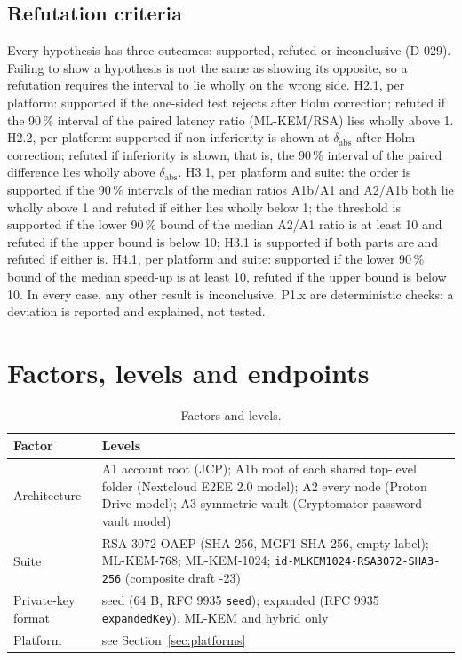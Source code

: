 \documentclass[11pt,a4paper]{article}
\begin{document}
\subsection{Refutation criteria}\label{sec:refutation}
Every hypothesis has three outcomes: supported, refuted or inconclusive (D-029). Failing to show a hypothesis is not the same as showing its opposite, so a refutation requires the interval to lie wholly on the wrong side. H2.1, per platform: supported if the one-sided test rejects after Holm correction; refuted if the 90\,\% interval of the paired latency ratio (ML-KEM/RSA) lies wholly above 1. H2.2, per platform: supported if non-inferiority is shown at $\delta_{\mathrm{abs}}$ after Holm correction; refuted if inferiority is shown, that is, the 90\,\% interval of the paired difference lies wholly above $\delta_{\mathrm{abs}}$. H3.1, per platform and suite: the order is supported if the 90\,\% intervals of the median ratios A1b/A1 and A2/A1b both lie wholly above 1 and refuted if either lies wholly below 1; the threshold is supported if the lower 90\,\% bound of the median A2/A1 ratio is at least 10 and refuted if the upper bound is below 10; H3.1 is supported if both parts are and refuted if either is. H4.1, per platform and suite: supported if the lower 90\,\% bound of the median speed-up is at least 10, refuted if the upper bound is below 10. In every case, any other result is inconclusive. P1.x are deterministic checks: a deviation is reported and explained, not tested.

\section{Factors, levels and endpoints}
\begin{table}[H]
\centering\small
\caption{Factors and levels.}
\begin{tabularx}{\textwidth}{l L}
\toprule
\textbf{Factor} & \textbf{Levels}\\
\midrule
Architecture & A1 account root (JCP); A1b root of each shared top-level folder (Nextcloud E2EE 2.0 model); A2 every node (Proton Drive model); A3 symmetric vault (Cryptomator password vault model)\\
Suite & RSA-3072 OAEP (SHA-256, MGF1-SHA-256, empty label); ML-KEM-768; ML-KEM-1024; \texttt{id-MLKEM1024-\allowbreak RSA3072-SHA3-256} (composite draft -23)\\
Private-key format & seed (64 B, RFC 9935 \texttt{seed}); expanded (RFC 9935 \texttt{expandedKey}). ML-KEM and hybrid only\\
Platform & see Section~\ref{sec:platforms}\\
\bottomrule
\end{tabularx}
\end{table}
\end{document}
